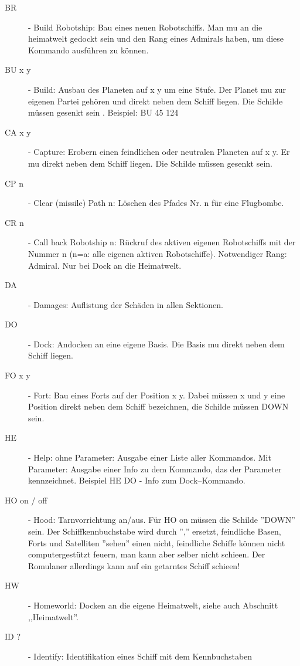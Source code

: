\begin{description}      
\item [BR] - Build Robotship: Bau eines neuen Robotschiffs. Man mu\3 an die
      heimatwelt gedockt sein und den Rang eines Admirals haben, um diese 
      Kommando ausf\"uhren zu k\"onnen.
\item [BU x y] - Build: Ausbau des Planeten auf x y um eine Stufe. 
        Der Planet mu\3 zur eigenen Partei geh\"oren und direkt neben dem
        Schiff liegen. Die Schilde m\"ussen gesenkt sein . Beispiel: BU 45 124
\item [CA x y] - Capture: Erobern einen feindlichen oder neutralen
        Planeten auf x y. Er mu\3 direkt neben
        dem Schiff liegen. Die Schilde m\"ussen gesenkt sein.
\item [CP n] - Clear (missile) Path n: L\"oschen des Pfades Nr. n f\"ur eine
      Flugbombe.
\item [CR n] - Call back Robotship n: R\"uckruf des aktiven eigenen 
               Robotschiffs mit der Nummer n (n=a: alle eigenen aktiven
               Robotschiffe). Notwendiger Rang: Admiral. Nur bei Dock an die
               Heimatwelt.
\item [DA] - Damages: Auflistung der Sch\"aden in allen Sektionen.
\item [DO] - Dock: Andocken an eine eigene Basis. Die Basis mu\3 direkt neben
    dem Schiff liegen.
\item [FO x y] - Fort: Bau eines Forts auf der Position x y. Dabei 
         m\"ussen x und y 
         eine Position direkt neben dem Schiff bezeichnen, die Schilde m\"ussen
         DOWN sein.
\item [HE] - Help: ohne Parameter: Ausgabe einer Liste aller Kommandos. Mit
            Parameter: Ausgabe einer Info zu dem Kommando, das der Parameter
            kennzeichnet. Beispiel HE DO - Info zum Dock--Kommando.
\item [HO on / off] - Hood: Tarnvorrichtung an/aus. F\"ur HO on 
             m\"ussen die Schilde
             ''DOWN'' sein. Der Schiffkennbuchstabe wird durch '','' ersetzt, 
             feindliche Basen, Forts und Satelliten ''sehen'' einen nicht, 
             feindliche Schiffe k\"onnen nicht computergest\"utzt feuern, man
             kann aber selber nicht schie\3en. Der Romulaner allerdings kann
             auf ein getarntes Schiff schie\3en!
\item [HW] - Homeworld: Docken an die eigene Heimatwelt, siehe auch Abschnitt
          ,,Heimatwelt''.
\item [ID ?] - Identify: Identifikation eines Schiff mit dem Kennbuchstaben

\end{description}
